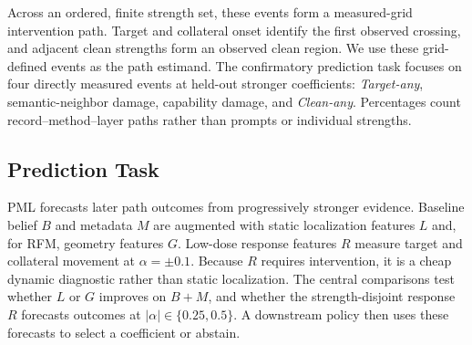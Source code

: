 Across an ordered, finite strength set, these events form a measured-grid
intervention path. Target and collateral onset identify the first observed
crossing, and adjacent clean strengths form an observed clean region. We use
these grid-defined events as the path estimand.
The confirmatory prediction task focuses on four directly measured events at
held-out stronger coefficients:
\emph{Target-any}, semantic-neighbor damage,
capability damage, and \emph{Clean-any}. Percentages count
record--method--layer paths rather than prompts or individual strengths.

\subsection{Prediction Task}

PML forecasts later path outcomes from progressively stronger evidence.
Baseline belief $B$ and metadata $M$ are augmented with static localization
features $L$ and, for RFM, geometry features $G$. Low-dose response features
$R$ measure target and collateral movement at $\alpha=\pm0.1$. Because $R$
requires intervention, it is a cheap dynamic diagnostic rather than static
localization. The central comparisons test whether $L$ or $G$ improves on
$B+M$, and whether the strength-disjoint response $R$ forecasts outcomes at
$|\alpha|\in\{0.25,0.5\}$. A downstream policy then uses these forecasts to
select a coefficient or abstain.
